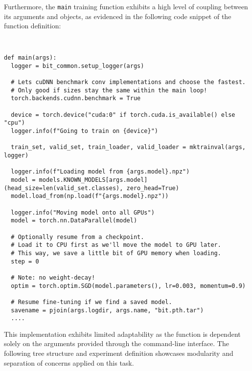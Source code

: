 Furthermore, the \texttt{main} training function exhibits a high level of coupling between its arguments and objects, as evidenced in the following code snippet of the function definition:

\begin{verbatim}


def main(args):
  logger = bit_common.setup_logger(args)

  # Lets cuDNN benchmark conv implementations and choose the fastest.
  # Only good if sizes stay the same within the main loop!
  torch.backends.cudnn.benchmark = True

  device = torch.device("cuda:0" if torch.cuda.is_available() else "cpu")
  logger.info(f"Going to train on {device}")

  train_set, valid_set, train_loader, valid_loader = mktrainval(args, logger)

  logger.info(f"Loading model from {args.model}.npz")
  model = models.KNOWN_MODELS[args.model](head_size=len(valid_set.classes), zero_head=True)
  model.load_from(np.load(f"{args.model}.npz"))

  logger.info("Moving model onto all GPUs")
  model = torch.nn.DataParallel(model)

  # Optionally resume from a checkpoint.
  # Load it to CPU first as we'll move the model to GPU later.
  # This way, we save a little bit of GPU memory when loading.
  step = 0

  # Note: no weight-decay!
  optim = torch.optim.SGD(model.parameters(), lr=0.003, momentum=0.9)

  # Resume fine-tuning if we find a saved model.
  savename = pjoin(args.logdir, args.name, "bit.pth.tar")
  ....
\end{verbatim}

This implementation exhibits limited adaptability as the function is dependent solely on the arguments provided through the command-line interface. The following tree structure and experiment definition showcases modularity and separation of concerns applied on this task.


